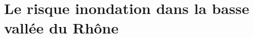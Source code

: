 \documentclass[11pt]{article}
\begin{document}
%		


		
	\section{Le risque inondation dans la basse vallée du Rhône}
	
\end{document}

